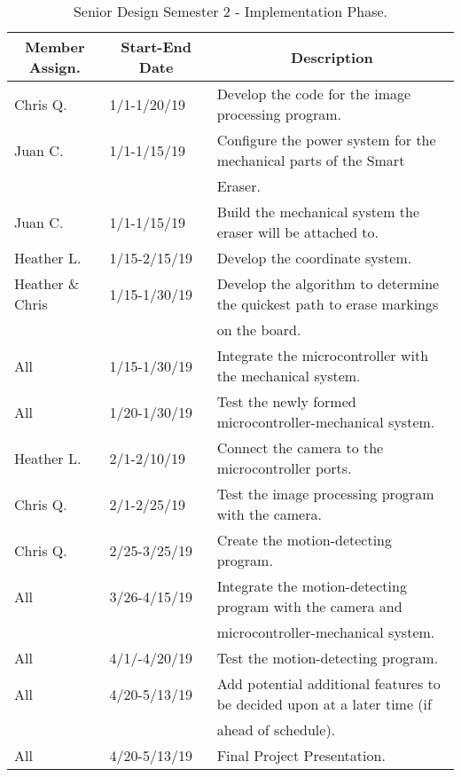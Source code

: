 \setlength{\parindent}{5ex}
\begin{table} [H]	
	\normalsize
	\centering
	\begin{tabular}{|l|l|l|}
		\hline
		\multicolumn{1}{|c|}{\textbf{Member Assign.}} & \multicolumn{1}{|c|}{\textbf{Start-End Date}} & \multicolumn{1}{|c|}{\textbf{Description}} \\
		\hline
		Chris Q. & 1/1-1/20/19 & Develop the code for the image processing program. \\
		\hline
		Juan C. & 1/1-1/15/19 & Configure the power system for the mechanical parts of the Smart \\
		& & Eraser. \\
		\hline
		Juan C. & 1/1-1/15/19 & Build the mechanical system the eraser will be attached to.\\
		\hline
		Heather L. & 1/15-2/15/19 & Develop the coordinate system. \\
		\hline
		Heather \& Chris & 1/15-1/30/19 & Develop the algorithm to determine the quickest path to erase markings \\
		& & on the board.\\
		\hline
		All & 1/15-1/30/19 & Integrate the microcontroller with the mechanical system.\\
		\hline
		All & 1/20-1/30/19 & Test the newly formed microcontroller-mechanical system.\\
		\hline
		Heather L. & 2/1-2/10/19 & Connect the camera to the microcontroller ports.\\
		\hline
		Chris Q. & 2/1-2/25/19 & Test the image processing program with the camera.\\
		\hline
		Chris Q. & 2/25-3/25/19 & Create the motion-detecting program.\\
		\hline
		All & 3/26-4/15/19 & Integrate the motion-detecting program with the camera and \\
		& & microcontroller-mechanical system.\\
		\hline
		All & 4/1/-4/20/19 & Test the motion-detecting program.\\
		\hline
		All & 4/20-5/13/19 & 
		Add potential additional features to be decided upon at a later time (if \\
		& & ahead of schedule).\\
		\hline
		All & 4/20-5/13/19 & 
		Final Project Presentation.\\
		\hline
	\end{tabular} 
	\caption{Senior Design Semester 2 - Implementation Phase.}
	\label{table:3}
\end{table}
